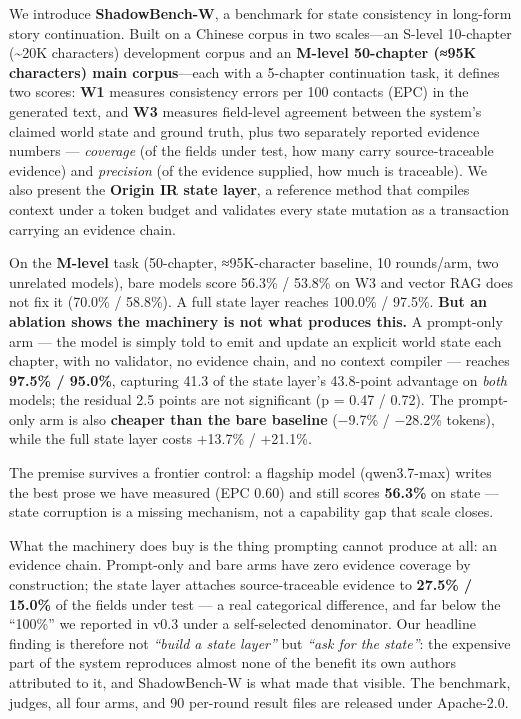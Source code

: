 \documentclass[
  english,
]{article}
\newcounter{none} %
\begin{document}
We introduce \textbf{ShadowBench-W}, a benchmark for state consistency
in long-form story continuation. Built on a Chinese corpus in two
scales---an S-level 10-chapter (\textasciitilde20K characters)
development corpus and an \textbf{M-level 50-chapter (≈95K characters)
main corpus}---each with a 5-chapter continuation task, it defines two
scores: \textbf{W1} measures consistency errors per 100 contacts (EPC)
in the generated text, and \textbf{W3} measures field-level agreement
between the system's claimed world state and ground truth, plus two
separately reported evidence numbers --- \emph{coverage} (of the fields
under test, how many carry source-traceable evidence) and
\emph{precision} (of the evidence supplied, how much is traceable). We
also present the \textbf{Origin IR state layer}, a reference method that
compiles context under a token budget and validates every state mutation
as a transaction carrying an evidence chain.

On the \textbf{M-level} task (50-chapter, ≈95K-character baseline, 10
rounds/arm, two unrelated models), bare models score 56.3\% / 53.8\% on
W3 and vector RAG does not fix it (70.0\% / 58.8\%). A full state layer
reaches 100.0\% / 97.5\%. \textbf{But an ablation shows the machinery is
not what produces this.} A prompt-only arm --- the model is simply told
to emit and update an explicit world state each chapter, with no
validator, no evidence chain, and no context compiler --- reaches
\textbf{97.5\% / 95.0\%}, capturing 41.3 of the state layer's 43.8-point
advantage on \emph{both} models; the residual 2.5 points are not
significant (p = 0.47 / 0.72). The prompt-only arm is also
\textbf{cheaper than the bare baseline} (−9.7\% / −28.2\% tokens), while
the full state layer costs +13.7\% / +21.1\%.

The premise survives a frontier control: a flagship model (qwen3.7-max)
writes the best prose we have measured (EPC 0.60) and still scores
\textbf{56.3\%} on state --- state corruption is a missing mechanism,
not a capability gap that scale closes.

What the machinery does buy is the thing prompting cannot produce at
all: an evidence chain. Prompt-only and bare arms have zero evidence
coverage by construction; the state layer attaches source-traceable
evidence to \textbf{27.5\% / 15.0\%} of the fields under test --- a real
categorical difference, and far below the ``100\%'' we reported in v0.3
under a self-selected denominator. Our headline finding is therefore not
\emph{``build a state layer''} but \emph{``ask for the state''}: the
expensive part of the system reproduces almost none of the benefit its
own authors attributed to it, and ShadowBench-W is what made that
visible. The benchmark, judges, all four arms, and 90 per-round result
files are released under Apache-2.0.
\end{document}

